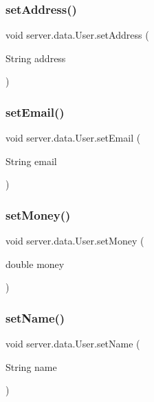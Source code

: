 \subsubsection{\texorpdfstring{set\+Address()}{setAddress()}}
{\footnotesize\ttfamily void server.\+data.\+User.\+set\+Address (\begin{DoxyParamCaption}\item[{String}]{address }\end{DoxyParamCaption})}

\mbox{\label{classserver_1_1data_1_1_user_ace8890c975b2543bbbf4d19b4e64d367}} 
\subsubsection{\texorpdfstring{set\+Email()}{setEmail()}}
{\footnotesize\ttfamily void server.\+data.\+User.\+set\+Email (\begin{DoxyParamCaption}\item[{String}]{email }\end{DoxyParamCaption})}

\mbox{\label{classserver_1_1data_1_1_user_a5448e1a49de3b0057c9bd57b7dcfe888}} 
\subsubsection{\texorpdfstring{set\+Money()}{setMoney()}}
{\footnotesize\ttfamily void server.\+data.\+User.\+set\+Money (\begin{DoxyParamCaption}\item[{double}]{money }\end{DoxyParamCaption})}

\mbox{\label{classserver_1_1data_1_1_user_aab7b2fc87e25728de4b294c9e70811c2}} 
\subsubsection{\texorpdfstring{set\+Name()}{setName()}}
{\footnotesize\ttfamily void server.\+data.\+User.\+set\+Name (\begin{DoxyParamCaption}\item[{String}]{name }\end{DoxyParamCaption})}

